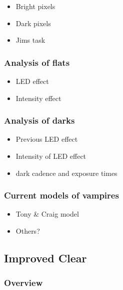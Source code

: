 \begin{itemize}
\tightlist
\item
  Bright pixels
\item
  Dark pixels
\item
  Jim\textquotesingle s task
\end{itemize}

\subsubsection{Analysis of flats}\label{analysis-of-flats}

\begin{itemize}
\tightlist
\item
  LED effect
\item
  Intensity effect
\end{itemize}

\subsubsection{Analysis of darks}\label{analysis-of-darks}

\begin{itemize}
\tightlist
\item
  Previous LED effect
\item
  Intensity of LED effect
\item
  dark cadence and exposure times
\end{itemize}

\subsubsection{Current models of
vampires}\label{current-models-of-vampires}

\begin{itemize}
\tightlist
\item
  Tony \& Craig model
\item
  Others?
\end{itemize}

\subsection{Improved Clear}\label{improved-clear}

\subsubsection{Overview}\label{overview}

